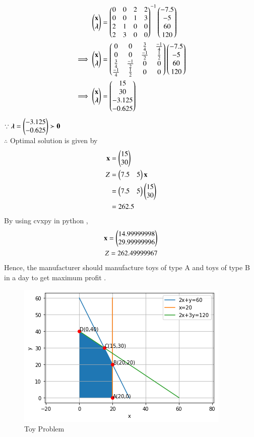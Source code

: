 \documentclass[journal,12pt,twocolumn]{IEEEtran}
\begin{document}
\begin{align}
    \begin{pmatrix}\mathbf{x} \\ \boldsymbol{\lambda}\end{pmatrix} &= \begin{pmatrix}0 & 0 & 2 & 2 \\ 0 & 0 & 1 & 3 \\ 2 & 1 & 0 & 0 \\ 2 & 3 & 0 & 0\end{pmatrix}^{-1}\begin{pmatrix}-7.5 \\ -5 \\ 60 \\ 120\end{pmatrix}
    \\
    \implies   \begin{pmatrix}\mathbf{x} \\ \boldsymbol{\lambda}\end{pmatrix} &= \begin{pmatrix}0 & 0 & \frac{3}{4} & \frac{-1}{4} \\ 0 & 0 & \frac{-1}{2} & \frac{1}{2} \\ \frac{3}{4} & \frac{-1}{2} & 0 & 0 \\ \frac{-1}{4} & \frac{1}{2} & 0 & 0\end{pmatrix}\begin{pmatrix}-7.5 \\ -5 \\ 60 \\ 120\end{pmatrix}
    \\
    \implies \begin{pmatrix}\mathbf{x} \\ \boldsymbol{\lambda}\end{pmatrix} &= \begin{pmatrix}15 \\ 30 \\ -3.125 \\ -0.625\end{pmatrix}
\end{align}
$\because \boldsymbol{\lambda}=\begin{pmatrix}-3.125 \\ -0.625\end{pmatrix} \succ \mathbf{0} $
\\
$\therefore$ Optimal solution is given by
\begin{align}
    \mathbf{x} &= \begin{pmatrix}15\\30\end{pmatrix} \\
    Z &= \begin{pmatrix}7.5 & 5\end{pmatrix}\mathbf{x} \\
    &= \begin{pmatrix}7.5 & 5\end{pmatrix}\begin{pmatrix}15 \\ 30\end{pmatrix} \\
    &= 262.5
\end{align}
By using cvxpy in python ,
\begin{align}
    \mathbf{x}=\begin{pmatrix}14.99999998\\29.99999996\end{pmatrix}\\
    Z = 262.49999967
\end{align}
Hence, the manufacturer should manufacture  toys of type A and  toys of type B in a day to get maximum profit .
\begin{figure}[!ht]
\centering
\includegraphics[width=\columnwidth]{Figure10}
\caption{Toy Problem}
\label{fig:toy problem}	
\end{figure}
\end{document}
